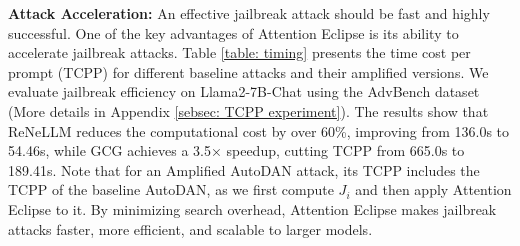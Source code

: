 \noindent \textbf{Attack Acceleration:} An effective jailbreak attack should be fast and highly successful. One of the key advantages of Attention Eclipse is its ability to accelerate jailbreak attacks. Table \ref{table: timing} presents the time cost per prompt (TCPP) for different baseline attacks and their amplified versions. We evaluate jailbreak efficiency on Llama2-7B-Chat using the AdvBench dataset (More details in Appendix \ref{sebsec: TCPP experiment}). The results show that ReNeLLM reduces the computational cost by over 60\%, improving from 136.0s to 54.46s, while GCG achieves a 3.5× speedup, cutting TCPP from 665.0s to 189.41s. Note that for an Amplified AutoDAN attack, its TCPP includes the TCPP of the baseline AutoDAN, as we first compute $J_i$ and then apply Attention Eclipse to it. By minimizing search overhead, Attention Eclipse makes jailbreak attacks faster, more efficient, and scalable to larger models. \\


\begin{table}[h]
\centering
{}
\caption{Time Cost Per Prompt (TCPP) for baseline jailbreak attacks and their amplified versions using the Attention Eclipse framework on the Llama2-7B-Chat model and a subset of AdvBench dataset.}
\label{table: timing}  
\end{table}



